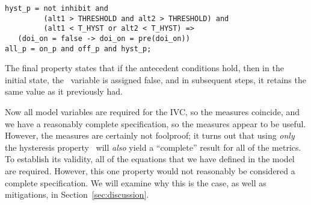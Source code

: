 {\smaller
\begin{verbatim}
hyst_p = not inhibit and
         (alt1 > THRESHOLD and alt2 > THRESHOLD) and
         (alt1 < T_HYST or alt2 < T_HYST) =>
   (doi_on = false -> doi_on = pre(doi_on))
all_p = on_p and off_p and hyst_p;
\end{verbatim}
}
\noindent The final property states that if the antecedent conditions hold, then in the initial state, the \doion\ variable is assigned false, and in subsequent steps, it retains the same value as it previously had.

Now all model variables are required for the IVC, so the measures coincide, and we have a reasonably complete specification, so the measures appear to be useful.  However, the measures are certainly not foolproof; it turns out that using {\em only} the hysteresis property \hystp\ will {\em also} yield a ``complete'' result for all of the metrics.  To establish its validity, all of the equations that we have defined in the model are required.  However, this one property would not reasonably be considered a complete specification.  We will examine why this is the case, as well as mitigations, in Section~\ref{sec:discussion}.
%
